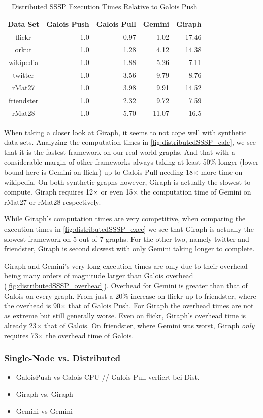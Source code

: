 \begin{table}
\renewcommand{\arraystretch}{1.3}
\centering
\caption{Distributed SSSP Execution Times Relative to Galois Push}
\begin{tabular}{crrrr}
\hline
\bf{Data Set}&Galois Push&Galois Pull&Gemini&Giraph\\\hline
flickr&1.0&0.97&1.02&17.46\\
orkut&1.0&1.28&4.12&14.38\\
wikipedia&1.0&1.88&5.26&7.11\\
twitter&1.0&3.56&9.79&8.76\\
rMat27&1.0&3.98&9.91&14.52\\
friendster&1.0&2.32&9.72&7.59\\
rMat28&1.0&5.70&11.07&16.5\\\hline
\end{tabular}
\label{tbl:ssspexec}
\end{table}



When taking a closer look at Giraph, it seems to not cope well with synthetic data sets. Analyzing the computation times in \autoref{fig:distributedSSSP_calc}, we see that it is the fastest framework on our real-world graphs. And that with a considerable margin of other frameworks always taking at least 50\% longer (lower bound here is Gemini on flickr) up to Galois Pull needing 18$\times$ more time on wikipedia.
On both synthetic graphs however, Giraph is actually the slowest to compute. Giraph requires 12$\times$ or even 15$\times$ the computation time of Gemini on rMat27 or rMat28 respectively.

While Giraph's computation times are very competitive, when comparing the execution times in \autoref{fig:distributedSSSP_exec} we see that Giraph is actually the slowest framework on 5 out of 7 graphs. For the other two, namely twitter and friendster, Giraph is second slowest with only Gemini taking longer to complete.

Giraph and Gemini's very long execution times are only due to their overhead being many orders of magnitude larger than Galois overhead (\autoref{fig:distributedSSSP_overhead}).
Overhead for Gemini is greater than that of Galois on every graph. From just a 20\% increase on flickr up to friendster, where the overhead is 90$\times$ that of Galois Push.
For Giraph the overhead times are not as extreme but still generally worse. Even on flickr, Giraph's overhead time is already 23$\times$ that of Galois. On friendster, where Gemini was worst, Giraph \emph{only} requires 73$\times$ the overhead time of Galois.



\subsubsection{Single-Node vs. Distributed}
\begin{itemize}
	\item GaloisPush vs Galois CPU // Galois Pull verliert bei Dist.
	\item Giraph vs. Giraph
	\item Gemini vs Gemini
\end{itemize}


